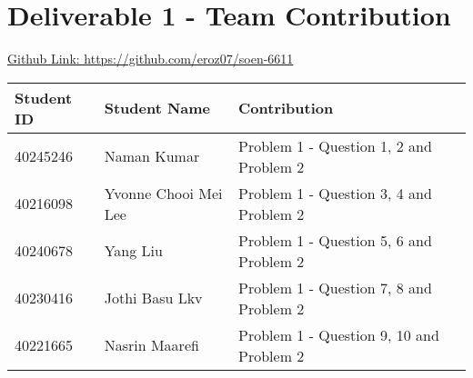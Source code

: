 \chapter{Deliverable 1 - Team Contribution}

\href{https://github.com/eroz07/soen-6611}{Github Link: https://github.com/eroz07/soen-6611}
 
\vspace{12pt}

\begin{tabularx}{\textwidth}{|l|l|X|}
\hline
Student ID & Student Name & Contribution \\
\hline
40245246 & Naman Kumar & Problem 1 - Question 1, 2 and Problem 2\\
40216098 & Yvonne Chooi Mei Lee & Problem 1 - Question 3, 4 and Problem 2\\
40240678 & Yang Liu & Problem 1 - Question 5, 6 and Problem 2\\
40230416 & Jothi Basu Lkv & Problem 1 - Question 7, 8 and Problem 2\\
40221665 & Nasrin Maarefi & Problem 1 - Question 9, 10 and Problem 2\\


\hline
\end{tabularx}